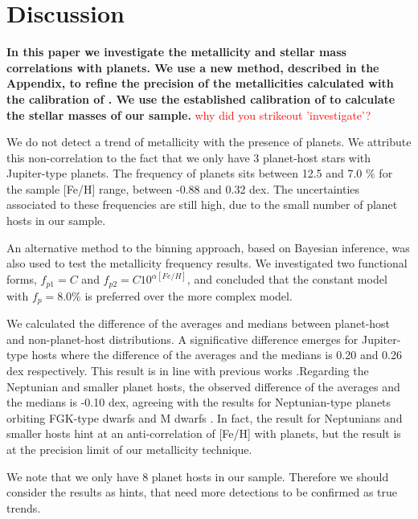 \documentclass[structabstract]{aa}
\begin{document}
\section{Discussion}
\label{discussion}

\textbf{In this paper we investigate the metallicity and stellar mass correlations with planets. We use a new method, described in the Appendix, to refine the precision of the metallicities calculated with the calibration of \citet{Neves-2012}. We use the established calibration of \citet{Delfosse-2000} to calculate the stellar masses of our sample.} %
\textcolor{red}{why did you strikeout 'investigate'?}

We do not detect a trend of metallicity with the presence of planets. We attribute this non-correlation to the fact that we only have 3 planet-host stars with Jupiter-type planets. The frequency of planets sits between 12.5 and 7.0 \% for the sample [Fe/H] range, between -0.88 and 0.32 dex. The uncertainties associated to these frequencies are still high, due to the small number of planet hosts in our sample.

An alternative method to the binning approach, based on Bayesian inference, was also used to test the metallicity frequency results. We investigated two functional forms, $f_{p1} = C$ and $f_{p2} = C10^{\alpha[Fe/H]}$, and concluded that the constant model with $f_{p} = 8.0\%$  is preferred over the more complex model. 

We calculated the difference of the averages and medians between planet-host and non-planet-host distributions. A significative difference emerges for Jupiter-type hosts where the difference of the averages and the medians is 0.20 and 0.26 dex respectively. This result is in line with previous works \citep[e.g.][]{Bonfils-2007,Johnson-2009, Schlaufman-2010, Rojas-Ayala-2012, Terrien-2012}.Regarding the Neptunian and smaller planet hosts, the observed difference of the averages and the medians is -0.10 dex, agreeing with the results for Neptunian-type planets orbiting FGK-type dwarfs \citep[e.g][]{Sousa-2011b, Mayor-2011} and M dwarfs \citep[e.g.][]{Rojas-Ayala-2012,Terrien-2012}. In fact, the result for Neptunians and smaller hosts hint at an anti-correlation of [Fe/H] with planets, but the result is at the precision limit of our metallicity technique. 

We note that we only have 8 planet hosts in our sample. Therefore we should consider the results as hints, that need more detections to be confirmed as true trends.
\end{document}
